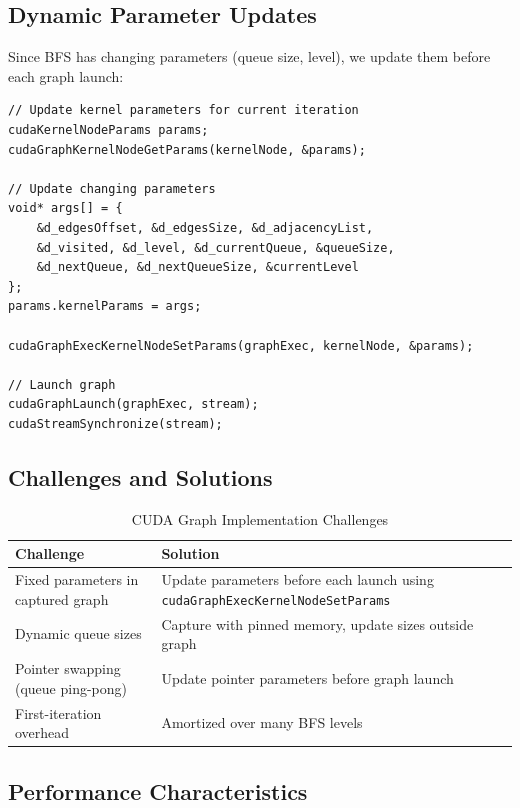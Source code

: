 \documentclass[11pt,a4paper]{article}
\begin{document}
\subsection{Dynamic Parameter Updates}

Since BFS has changing parameters (queue size, level), we update them before each graph launch:

\begin{lstlisting}[caption={Updating Graph Parameters}]
// Update kernel parameters for current iteration
cudaKernelNodeParams params;
cudaGraphKernelNodeGetParams(kernelNode, &params);

// Update changing parameters
void* args[] = {
    &d_edgesOffset, &d_edgesSize, &d_adjacencyList,
    &d_visited, &d_level, &d_currentQueue, &queueSize,
    &d_nextQueue, &d_nextQueueSize, &currentLevel
};
params.kernelParams = args;

cudaGraphExecKernelNodeSetParams(graphExec, kernelNode, &params);

// Launch graph
cudaGraphLaunch(graphExec, stream);
cudaStreamSynchronize(stream);
\end{lstlisting}

\subsection{Challenges and Solutions}

\begin{table}[H]
\centering
\caption{CUDA Graph Implementation Challenges}
\begin{tabular}{@{}p{}p{}@{}}
\toprule
\textbf{Challenge} & \textbf{Solution} \\ \midrule
Fixed parameters in captured graph & Update parameters before each launch using \texttt{cudaGraphExecKernelNodeSetParams} \\[0.3cm]
Dynamic queue sizes & Capture with pinned memory, update sizes outside graph \\[0.3cm]
Pointer swapping (queue ping-pong) & Update pointer parameters before graph launch \\[0.3cm]
First-iteration overhead & Amortized over many BFS levels \\
\bottomrule
\end{tabular}
\end{table}

\subsection{Performance Characteristics}
\end{document}
